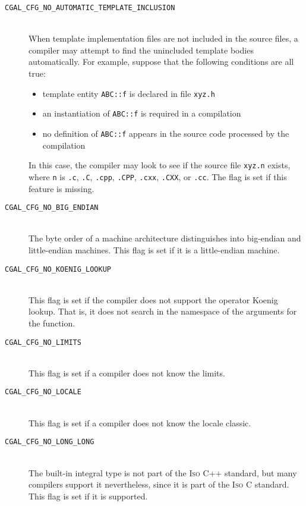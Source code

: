 \begin{description}
\item[{\tt CGAL\_CFG\_NO\_AUTOMATIC\_TEMPLATE\_INCLUSION}]~\\
 When template implementation files are not included in the source files,
 a compiler may attempt to find the unincluded template bodies
 automatically. For example, suppose that the following conditions are
 all true:
 \begin{itemize}
 \item template entity {\tt ABC::f} is declared in file {\tt xyz.h}
 \item an instantiation of {\tt ABC::f} is required in a compilation
 \item no definition of {\tt ABC::f} appears in the source code processed by
       the compilation
 \end{itemize}
 In this case, the compiler may look to see if the source file {\tt xyz.n}
 exists, where {\tt n} is {\tt .c}, {\tt .C}, {\tt .cpp}, {\tt .CPP}, 
 {\tt .cxx}, {\tt .CXX}, or {\tt .cc}. The flag
 is set if this feature is missing.
 
\item[{\tt CGAL\_CFG\_NO\_BIG\_ENDIAN}]~\\
  The byte order of a machine architecture distinguishes into
  big-endian and little-endian machines.  This flag is
  set if it is a little-endian machine.
 
\item[{\tt CGAL\_CFG\_NO\_KOENIG\_LOOKUP}]~\\
  This flag is set if the compiler does not support the operator
  Koenig lookup. That is, it does not search in the namespace of the
  arguments for the function.
 
\item[{\tt CGAL\_CFG\_NO\_LIMITS}]~\\
  This flag is set if a compiler does not know the limits.

\item[{\tt CGAL\_CFG\_NO\_LOCALE}]~\\
  This flag is set if a compiler does not know the locale classic. 

\item[{\tt CGAL\_CFG\_NO\_LONG\_LONG}]~\\
  The  built-in integral type is not part of the
  \textsc{Iso} C++ standard, but many compilers support it
  nevertheless, since it is part of the \textsc{Iso} C standard. This
  flag is set if it is supported.
  

\end{description}

